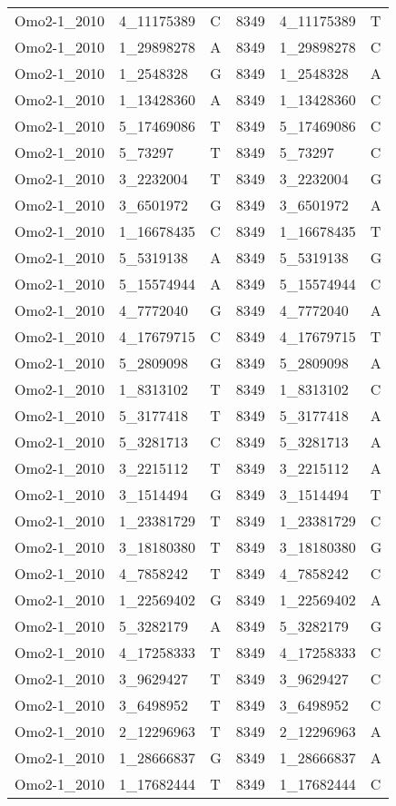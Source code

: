 \begin{center}
\begin{longtable}{|l|l|l|l|l|l|}
Omo2-1\_2010&4\_11175389&C&8349&4\_11175389&T\\
Omo2-1\_2010&1\_29898278&A&8349&1\_29898278&C\\
Omo2-1\_2010&1\_2548328&G&8349&1\_2548328&A\\
Omo2-1\_2010&1\_13428360&A&8349&1\_13428360&C\\
Omo2-1\_2010&5\_17469086&T&8349&5\_17469086&C\\
Omo2-1\_2010&5\_73297&T&8349&5\_73297&C\\
Omo2-1\_2010&3\_2232004&T&8349&3\_2232004&G\\
Omo2-1\_2010&3\_6501972&G&8349&3\_6501972&A\\
Omo2-1\_2010&1\_16678435&C&8349&1\_16678435&T\\
Omo2-1\_2010&5\_5319138&A&8349&5\_5319138&G\\
Omo2-1\_2010&5\_15574944&A&8349&5\_15574944&C\\
Omo2-1\_2010&4\_7772040&G&8349&4\_7772040&A\\
Omo2-1\_2010&4\_17679715&C&8349&4\_17679715&T\\
Omo2-1\_2010&5\_2809098&G&8349&5\_2809098&A\\
Omo2-1\_2010&1\_8313102&T&8349&1\_8313102&C\\
Omo2-1\_2010&5\_3177418&T&8349&5\_3177418&A\\
Omo2-1\_2010&5\_3281713&C&8349&5\_3281713&A\\
Omo2-1\_2010&3\_2215112&T&8349&3\_2215112&A\\
Omo2-1\_2010&3\_1514494&G&8349&3\_1514494&T\\
Omo2-1\_2010&1\_23381729&T&8349&1\_23381729&C\\
Omo2-1\_2010&3\_18180380&T&8349&3\_18180380&G\\
Omo2-1\_2010&4\_7858242&T&8349&4\_7858242&C\\
Omo2-1\_2010&1\_22569402&G&8349&1\_22569402&A\\
Omo2-1\_2010&5\_3282179&A&8349&5\_3282179&G\\
Omo2-1\_2010&4\_17258333&T&8349&4\_17258333&C\\
Omo2-1\_2010&3\_9629427&T&8349&3\_9629427&C\\
Omo2-1\_2010&3\_6498952&T&8349&3\_6498952&C\\
Omo2-1\_2010&2\_12296963&T&8349&2\_12296963&A\\
Omo2-1\_2010&1\_28666837&G&8349&1\_28666837&A\\
Omo2-1\_2010&1\_17682444&T&8349&1\_17682444&C\\

\end{longtable}
\end{center}
